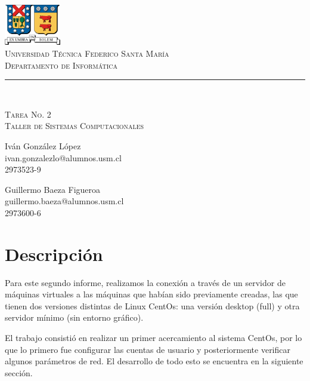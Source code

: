 \documentclass[11pt]{article}
\makeatletter
\newcommand{\labno}{2}
\newcommand{\labtitle}{Taller de Sistemas Computacionales}
\newcommand{\nameone}{Iván González López}
\newcommand{\emailone}{ivan.gonzalezlo@alumnos.usm.cl}
\newcommand{\rolone}{2973523-9}
\newcommand{\nametwo}{Guillermo Baeza Figueroa}
\newcommand{\emailtwo}{guillermo.baeza@alumnos.usm.cl}
\newcommand{\roltwo}{2973600-6}
\makeatother
\begin{document}
\begin{titlepage}
\begin{center}


\includegraphics[width=70pt]{logos/utfsm.pdf} \\
{\Large \textsc{Universidad Técnica Federico Santa María} \\}
{\Large \textsc{Departamento de Informática} \\ \vspace{4pt}}
{\rule[13pt]{\textwidth}{1pt} \\ \vspace{25pt}}
{\LARGE \textsc{Tarea No. \labno} \\}
{\LARGE \textsc{\labtitle} \\ \vspace{50pt}}

\begin{minipage}{0.4\textwidth}
\begin{flushleft}
{\large \nameone} \\
\emailone \\
\rolone
\end{flushleft}
\end{minipage}
\hfill
\begin{minipage}{0.4\textwidth}
\begin{flushright}
{\large \nametwo} \\
\emailtwo \\
\roltwo
\end{flushright}
\end{minipage}
\end{center}
\end{titlepage}


\section{Descripción}
Para este segundo informe, realizamos la conexión a través de un servidor de máquinas virtuales a las máquinas que habían sido previamente creadas, las que tienen dos versiones distintas de Linux CentOs: una versión desktop (full) y otra servidor mínimo (sin entorno gráfico).\par
El trabajo consistió en realizar un primer acercamiento al sistema CentOs, por lo que lo primero fue configurar las cuentas de usuario y posteriormente verificar algunos parámetros de red. El desarrollo de todo esto se encuentra en la siguiente sección.
\end{document}
